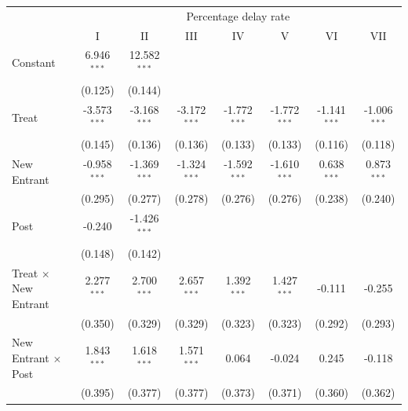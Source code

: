 \documentclass[
]{article}
\begin{document}
\begin{tabular}{lccccccc}
   \toprule
    & \multicolumn{7}{c}{Percentage delay rate}\\
                                              & I              & II             & III            & IV             & V              & VI             & VII\\  
   Constant                                   & 6.946$^{***}$  & 12.582$^{***}$ &                &                &                &                &   \\   
                                              & (0.125)        & (0.144)        &                &                &                &                &   \\   
   Treat                                      & -3.573$^{***}$ & -3.168$^{***}$ & -3.172$^{***}$ & -1.772$^{***}$ & -1.772$^{***}$ & -1.141$^{***}$ & -1.006$^{***}$\\   
                                              & (0.145)        & (0.136)        & (0.136)        & (0.133)        & (0.133)        & (0.116)        & (0.118)\\   
   New Entrant                                & -0.958$^{***}$ & -1.369$^{***}$ & -1.324$^{***}$ & -1.592$^{***}$ & -1.610$^{***}$ & 0.638$^{***}$  & 0.873$^{***}$\\   
                                              & (0.295)        & (0.277)        & (0.278)        & (0.276)        & (0.276)        & (0.238)        & (0.240)\\   
   Post                                       & -0.240         & -1.426$^{***}$ &                &                &                &                &   \\   
                                              & (0.148)        & (0.142)        &                &                &                &                &   \\   
   Treat $\times$ New Entrant                 & 2.277$^{***}$  & 2.700$^{***}$  & 2.657$^{***}$  & 1.392$^{***}$  & 1.427$^{***}$  & -0.111         & -0.255\\   
                                              & (0.350)        & (0.329)        & (0.329)        & (0.323)        & (0.323)        & (0.292)        & (0.293)\\   
   New Entrant $\times$ Post                  & 1.843$^{***}$  & 1.618$^{***}$  & 1.571$^{***}$  & 0.064          & -0.024         & 0.245          & -0.118\\   
                                              & (0.395)        & (0.377)        & (0.377)        & (0.373)        & (0.371)        & (0.360)        & (0.362)\\   

\end{tabular}
\end{document}
